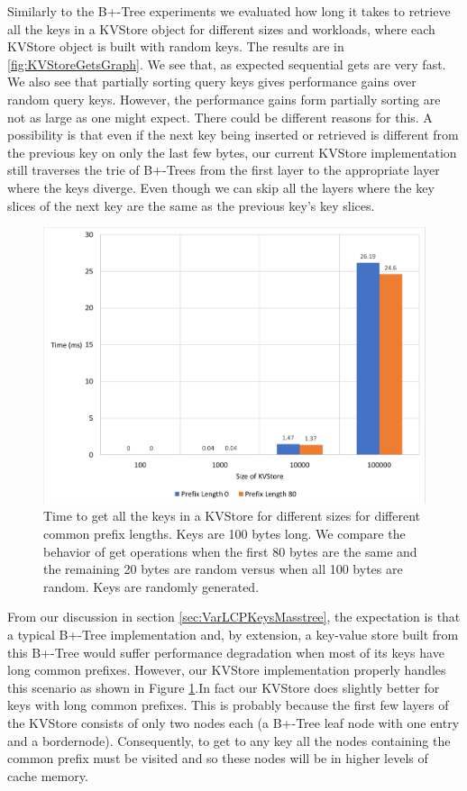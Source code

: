 Similarly to the B+-Tree experiments we evaluated how long it takes to retrieve all the keys in a KVStore object for different sizes and workloads, where each KVStore object is built with random keys. The results are in \ref{fig:KVStoreGetsGraph}. We see that, as expected sequential gets are very fast. We also see that partially sorting query keys gives performance gains over random query keys. However, the performance gains form partially sorting are not as large as one might expect. There could be different reasons for this. A possibility is that even if the next key being inserted or retrieved is different from the previous key on only the last few bytes, our current KVStore implementation still traverses the trie of B+-Trees from the first layer to the appropriate layer where the keys diverge. Even though we can skip all the layers where the key slices of the next key are the same as the previous key's key slices.


\begin{figure}[h]
    \centering
    \includegraphics[scale=0.50]{figures/kvstoreprefixgraph.png}
    \caption{Time to get all the keys in a KVStore for different sizes for different common prefix lengths. Keys are 100 bytes long. We compare the behavior of get operations when the first 80 bytes are the same and the remaining 20 bytes are random versus when all 100 bytes are random. Keys are randomly generated.}
    \label{fig:KVStoreCommonPrefixes}
\end{figure}

From our discussion in section \ref{sec:VarLCPKeysMasstree}, the expectation is that a typical B+-Tree implementation and, by extension, a key-value store built from this B+-Tree would suffer performance degradation when most of its keys have long common prefixes. However, our KVStore implementation properly handles this scenario as shown in Figure \ref{fig:KVStoreCommonPrefixes}.In fact our KVStore does slightly better for keys with long common prefixes. This is probably because the first few layers of the KVStore consists of only two nodes each (a B+-Tree leaf node with one entry and a bordernode). Consequently, to get to any key all the nodes containing the common prefix must be visited and so these nodes will be in higher levels of cache memory.
